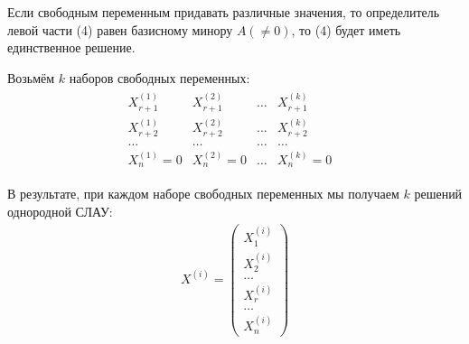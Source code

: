\begin{answer}
  Если свободным переменным придавать различные значения, то определитель левой части (4) равен базисному минору $A (\neq 0)$, то (4) будет иметь единственное решение.

  Возьмём $k$ наборов свободных переменных:
   \begin{gather*}
    \begin{matrix}
      X^{(1)}_{r+1} & X^{(2)}_{r+1} & \ldots & X^{(k)}_{r+1} \\
      X^{(1)}_{r+2} & X^{(2)}_{r+2} & \ldots & X^{(k)}_{r+2} \\
      \ldots & \ldots & \ldots & \ldots \\
      X^{(1)}_n = 0 & X^{(2)}_n = 0 & \ldots & X^{(k)}_n = 0 & 
    \end{matrix}
  \end{gather*}

  В результате, при каждом наборе свободных переменных мы получаем $k$ решений однородной СЛАУ:
   \begin{gather*}
     X^{(i)} = 
     \begin{pmatrix}
       X^{(i)}_1 \\
       X^{(i)}_2 \\
       \ldots \\
       X^{(i)}_r \\
       \ldots \\
       X^{(i)}_n
     \end{pmatrix}
  \end{gather*}


\end{answer}
